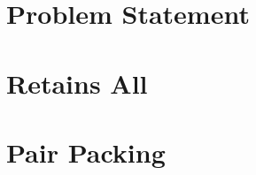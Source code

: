 \documentclass{beamer}
\begin{document}


\section{Problem Statement}



\section{Retains All}





\section{Pair Packing}




% 
% 

% 
\end{document}
